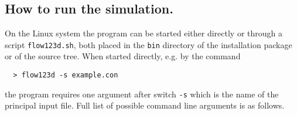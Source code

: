 \documentclass[12pt,a4paper]{report}
\begin{document}
\subsection{How to run the simulation.}
On the Linux system the program can be started either directly or through a script \verb'flow123d.sh', both placed in the \verb'bin' directory of the installation 
package or of the source tree. When started directly, e.g. by the command
\begin{verbatim}
  > flow123d -s example.con
\end{verbatim}
the program requires one argument after switch \verb'-s' which is the name of the principal input file. Full list of possible command line arguments is as follows.

\end{document}
